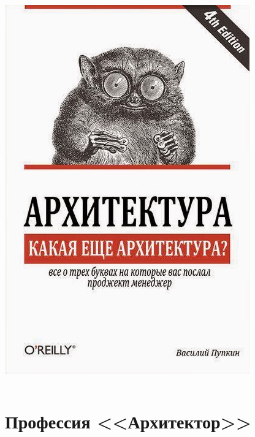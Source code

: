 \documentclass{../slides-style}
\begin{document}
\begin{frame}
\begin{columns}
\begin{column}{0.3\textwidth}
                \includegraphics[width=\textwidth]{whatArchitecture.png}
            \end{column}
        \end{columns}
    \end{frame}

    \section{Профессия <<Архитектор>>}
\end{document}
